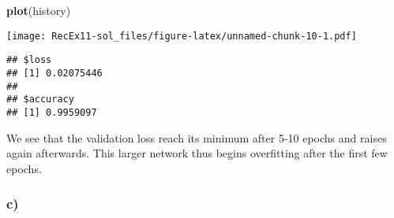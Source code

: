 \documentclass[]{article}
\newenvironment{Shaded}{\begin{snugshade}}{\end{snugshade}}
\newcommand{\KeywordTok}[1]{\textcolor[rgb]{0.13,0.29,0.53}{\textbf{#1}}}
\newcommand{\NormalTok}[1]{#1}
\newcommand{\OperatorTok}[1]{\textcolor[rgb]{0.81,0.36,0.00}{\textbf{#1}}}
\newcommand{\StringTok}[1]{\textcolor[rgb]{0.31,0.60,0.02}{#1}}
\begin{document}
\begin{Shaded}
\begin{Highlighting}[]
\KeywordTok{plot}\NormalTok{(history)}
\end{Highlighting}
\end{Shaded}

\texttt{[image: RecEx11-sol\_files/figure-latex/unnamed-chunk-10-1.pdf]}

\begin{Shaded}
\end{Shaded}

\begin{verbatim}
## $loss
## [1] 0.02075446
## 
## $accuracy
## [1] 0.9959097
\end{verbatim}

We see that the validation loss reach its minimum after 5-10 epochs and
raises again afterwards. This larger network thus begins overfitting
after the first few epochs.

\hypertarget{c-2}{%
\subsubsection{c)}\label{c-2}}
\end{document}
